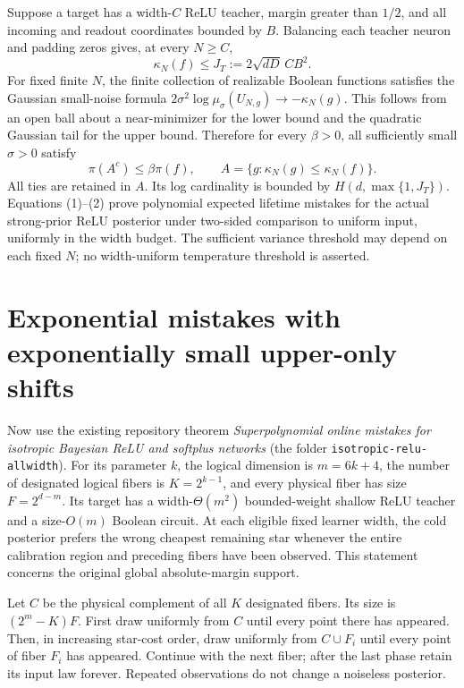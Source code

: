 \documentclass[11pt]{article}
\begin{document}
Suppose a target has a width-$C$ ReLU teacher, margin greater than
$1/2$, and all incoming and readout coordinates bounded by $B$.
Balancing each teacher neuron and padding zeros gives, at every $N\ge C$,
\[
 \kappa_N(f)\le J_T:=2\sqrt{dD}\,CB^2.
\]
For fixed finite $N$, the finite collection of realizable Boolean
functions satisfies the Gaussian small-noise formula
$2\sigma^2\log\mu_\sigma(U_{N,g})\to-\kappa_N(g)$.
This follows from an open ball about a near-minimizer for the lower
bound and the quadratic Gaussian tail for the upper bound. Therefore
for every $\beta>0$, all sufficiently small $\sigma>0$ satisfy
\[
 \pi(A^c)\le\beta\pi(f),\qquad
 A=\{g:\kappa_N(g)\le\kappa_N(f)\}.
\]
All ties are retained in $A$. Its log cardinality is bounded by
$H(d,\max\{1,J_T\})$. Equations (1)--(2) prove polynomial expected
lifetime mistakes for the actual strong-prior ReLU posterior under
two-sided comparison to uniform input, uniformly in the width budget.
The sufficient variance threshold may depend on each fixed $N$;
no width-uniform temperature threshold is asserted.

\section{Exponential mistakes with exponentially small upper-only shifts}
Now use the existing repository theorem
\emph{Superpolynomial online mistakes for isotropic Bayesian ReLU and softplus networks}
(the folder \texttt{isotropic-relu-allwidth}). For its parameter $k$, the
logical dimension is $m=6k+4$, the number of designated logical fibers is
$K=2^{k-1}$, and every physical fiber has size $F=2^{d-m}$.
Its target has a width-$\Theta(m^2)$ bounded-weight shallow ReLU teacher
and a size-$O(m)$ Boolean circuit. At each eligible fixed learner width,
the cold posterior prefers the wrong cheapest remaining star whenever
the entire calibration region and preceding fibers have been observed.
This statement concerns the original global absolute-margin support.

Let $C$ be the physical complement of all $K$ designated fibers.
Its size is $(2^m-K)F$. First draw uniformly from $C$ until every point
there has appeared. Then, in increasing star-cost order, draw uniformly
from $C\cup F_i$ until every point of fiber $F_i$ has appeared. Continue
with the next fiber; after the last phase retain its input law forever.
Repeated observations do not change a noiseless posterior.
\end{document}
